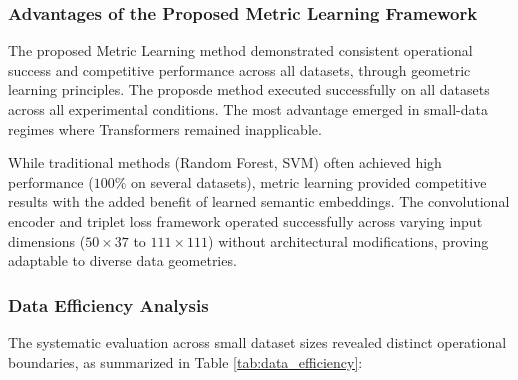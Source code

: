 \documentclass[a4paper,12pt,reqno]{amsart}
\theoremstyle{definition}
\theoremstyle{remark}
\begin{document}
\subsubsection{Advantages of the Proposed Metric Learning Framework}

The proposed Metric Learning method demonstrated consistent operational success and competitive performance across all datasets, through geometric learning principles.
The proposde method executed successfully on all datasets across all experimental conditions.
  The most advantage emerged in small-data regimes where Transformers remained inapplicable.
  
  
  While traditional methods (Random Forest, SVM) often achieved high performance ($100\%$ on several datasets), metric learning provided competitive results with the added benefit of learned semantic embeddings. The convolutional encoder and triplet loss framework operated successfully across varying input dimensions ($50\times37$ to $111\times111$) without architectural modifications, proving adaptable to diverse data geometries.



\subsubsection{Data Efficiency Analysis}

The systematic evaluation across small dataset sizes revealed distinct operational boundaries, as summarized in Table \ref{tab:data_efficiency}:
\end{document}
